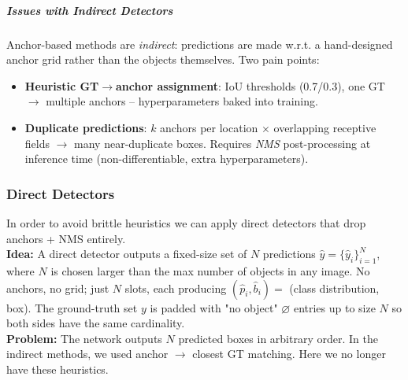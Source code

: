 \documentclass{article}
\begin{document}
\subparagraph{Issues with Indirect Detectors} Anchor-based methods are \textit{indirect}: predictions are made w.r.t. a hand-designed anchor grid rather than the objects themselves. Two pain points:
\begin{itemize}
    \item \textbf{Heuristic GT$\rightarrow$anchor assignment}: IoU thresholds (0.7/0.3), one GT $\to$ multiple anchors -- hyperparameters baked into training.
    \item \textbf{Duplicate predictions}: $k$ anchors per location $\times$ overlapping receptive fields $\rightarrow$ many near-duplicate boxes. Requires \textit{NMS} post-processing at inference time (non-differentiable, extra hyperparameters).
\end{itemize}

\subsubsection{Direct Detectors}
In order to avoid brittle heuristics we can apply direct detectors that drop anchors + NMS entirely. \\
\textbf{Idea:} A direct detector outputs a fixed-size set of $N$ predictions $\hat{y} =
\{\hat{y}_i\}_{i=1}^N$, where $N$ is chosen larger than the max number of objects in any image. No anchors, no
grid; just $N$ slots, each producing $(\hat{p}_i, \hat{b}_i) =$ (class distribution, box). The ground-truth set $y$ is padded with "no object" $\varnothing$ entries up to size $N$ so both sides have the same cardinality.\\
\textbf{Problem:} The network outputs $N$ predicted boxes in arbitrary order. In the indirect methods, we used anchor $\to$ closest GT matching. Here we no longer have these heuristics. 
\end{document}
